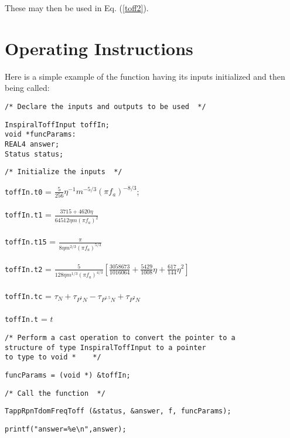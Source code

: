 \documentclass[12pt]{article}
\begin{document}
\vspace{5mm}

These may then be used in Eq. (\ref{toff2}).


\section{Operating Instructions}

Here is a simple example of the function having its inputs initialized and then being called:

\vspace{5mm}

\noindent
\begin{verbatim}
/* Declare the inputs and outputs to be used  */
\end{verbatim}
\texttt{InspiralToffInput toffIn;} \\
\texttt{void *funcParams:} \\
\texttt{REAL4 answer;} \\
\texttt{Status status;}
\begin{verbatim}
/* Initialize the inputs  */
\end{verbatim}
\texttt{toffIn.t0} = $\frac{5}{256} \eta^{-1} m^{-5/3} (\pi f_{a})^{-8/3}$; \\
\\
\texttt{toffIn.t1} = $\frac{3715+4620 \eta}{64512 \eta m (\pi f_{a})^{2}}$ \\
\\
\texttt{toffIn.t15} = $\frac{\pi}{8 \eta m^{2/3} (\pi f_{a})^{5/3}}$ \\
\\
\texttt{toffIn.t2} = $\frac{5}{128 \eta m^{1/3} (\pi f_{a})^{4/3}} \left[ \frac{3058673}{1016064} + \frac{5429}{1008} \eta + \frac{617}{144} \eta^{2} \right]$ \\
\\
\texttt{toffIn.tc} = $\tau_{N} + \tau_{P^{1}N} - \tau_{P^{1.5}N} + \tau_{P^{2}N}$ \\
\\
\texttt{toffIn.t} = $t$ \\
\begin{verbatim}
/* Perform a cast operation to convert the pointer to a 
structure of type InspiralToffInput to a pointer 
to type to void *    */
\end{verbatim}
\texttt{funcParams = (void *) \&toffIn;}
\begin{verbatim}
/* Call the function  */
\end{verbatim}
\texttt{TappRpnTdomFreqToff (\&status, \&answer, f, funcParams);}
\begin{verbatim}
printf("answer=%e\n",answer);
\end{verbatim}
\end{document}
